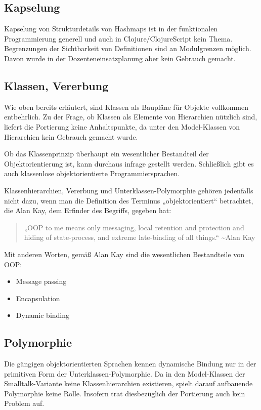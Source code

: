 \documentclass[11pt]{article}
\begin{document}
\subsection*{Kapselung}
\label{sec:org9bf0d36}
Kapselung von Strukturdetails von Hashmaps ist in der funktionalen
Programmierung generell und auch in Clojure/ClojureScript kein
Thema. Begrenzungen der Sichtbarkeit von Definitionen sind an
Modulgrenzen möglich. Davon wurde in der Dozenteneinsatzplanung aber
kein Gebrauch gemacht.

\subsection*{Klassen, Vererbung}
\label{sec:orga26c071}
Wie oben bereits erläutert, sind Klassen als Baupläne für Objekte
vollkommen entbehrlich. Zu der Frage, ob Klassen als Elemente von
Hierarchien nützlich sind, liefert die Portierung keine Anhaltspunkte,
da unter den Model-Klassen von Hierarchien kein Gebrauch gemacht
wurde.

Ob das Klassenprinzip überhaupt ein wesentlicher Bestandteil der
Objektorientierung ist, kann durchaus infrage gestellt
werden. Schließlich gibt es auch klassenlose objektorientierte
Programmiersprachen. 

Klassenhierarchien, Vererbung und Unterklassen-Polymorphie gehören
jedenfalls nicht dazu, wenn man die Definition des Terminus
„objektorientiert“ betrachtet, die Alan Kay, dem Erfinder des Begriffs,
gegeben hat:
\begin{quote}
„OOP to me means only messaging, local retention and protection and
hiding of state-process, and extreme late-binding of all things.“ 
\textasciitilde{}Alan Kay
\end{quote}
Mit anderen Worten, gemäß Alan Kay sind die wesentlichen Bestandteile
von OOP:
\begin{itemize}
\item Message passing
\item Encapsulation
\item Dynamic binding
\end{itemize}

\subsection*{Polymorphie}
\label{sec:org1a482f0}
Die gängigen objektorientierten Sprachen kennen dynamische Bindung nur
in der primitiven Form der Unterklassen-Polymorphie. Da in den
Model-Klassen der Smalltalk-Variante keine Klassenhierarchien
existieren, spielt darauf aufbauende Polymorphie keine Rolle. Insofern
trat diesbezüglich der Portierung auch kein Problem auf.
\end{document}
